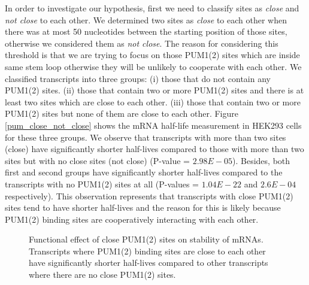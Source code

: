 In order to investigate our hypothesis, first we need to classify sites as \textit{close} and \textit{not close} to each other. We determined two sites as \textit{close} to each other when there was at most 50 nucleotides between the starting position of those sites, otherwise we considered them as \textit{not close}. The reason for considering this threshold is that we are trying to focus on those PUM1(2) sites which are inside same stem loop otherwise they will be unlikely to cooperate with each other. We classified transcripts into three groups: (i) those that do not contain any PUM1(2) sites. (ii) those that contain two or more PUM1(2) sites and there is at least two sites which are close to each other. (iii) those that contain two or more PUM1(2) sites but none of them are close to each other. Figure \ref{pum_close_not_close} shows the mRNA half-life measurement in HEK293 cells for these three groups. We observe that transcripts with more than two sites (close) have significantly shorter half-lives compared to those with more than two sites but with no close sites (not close) (P-value = $2.98E-05$). Besides, both first and second groups have significantly shorter half-lives compared to the transcripts with no PUM1(2) sites at all (P-values = $1.04E-22$ and $2.6E-04$ respectively). This observation represents that transcripts with close PUM1(2) sites tend to have shorter half-lives and the reason for this is likely because PUM1(2) binding sites are cooperatively interacting with each other.

\begin{figure}[H]
	\centering
\caption[Effect of close and not close PUM binding sites on expression of transcripts]{Functional effect of close PUM1(2) sites on stability of mRNAs. Transcripts where PUM1(2) binding sites are close to each other have significantly shorter half-lives compared to other transcripts where there are no close PUM1(2) sites.}
\end{figure}


